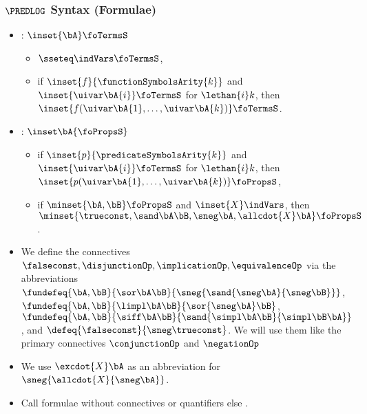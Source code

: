 \documentclass[notes,mh]{mikoslides}
\begin{document}
\begin{module}[id=pl1-syntax]
\begin{frame}[label=slide.pl1-syntax]
  \frametitle{$\PREDLOG$ Syntax (Formulae)}
  \begin{itemize}
  \item
    \begin{definition}[id=fo-terms.def,for={foterms,foTerms}]
      : $\inset{\bA}\foTermsS$ 
      \begin{itemize}
      \item $\sseteq\indVars\foTermsS$,
      \item if $\inset{f}{\functionSymbolsArity{k}}$ and $\inset{\uivar\bA{i}}\foTermsS$ for
        $\lethan{i}k$, then $\inset{f(\uivar\bA{1},\ldots,\uivar\bA{k})}\foTermsS$.
      \end{itemize}
    \end{definition}
  \item
    \begin{definition}[id=fo-propositions.def,for={foprops,foProps,allcdot}]
      : $\inset\bA{\foPropsS}$
      \begin{itemize}
      \item if $\inset{p}{\predicateSymbolsArity{k}}$ and $\inset{\uivar\bA{i}}\foTermsS$
        for $\lethan{i}k$, then $\inset{p(\uivar\bA{1},\ldots,\uivar\bA{k})}\foPropsS$,
      \item if $\minset{\bA,\bB}\foPropsS$ and $\inset{X}\indVars$, then
        $\minset{\trueconst,\sand\bA\bB,\sneg\bA,\allcdot{X}\bA}\foPropsS$.
      \end{itemize}
    \end{definition}
   \item 
     \begin{definition}[id=fo-connectives.def]
       We define the connectives
       $\falseconst,\disjunctionOp,\implicationOp,\equivalenceOp$ via the abbreviations
       $\fundefeq{\bA,\bB}{\sor\bA\bB}{\sneg{\sand{\sneg\bA}{\sneg\bB}}}$,
       $\fundefeq{\bA,\bB}{\limpl\bA\bB}{\sor{\sneg\bA}\bB}$,
       $\fundefeq{\bA,\bB}{\siff\bA\bB}{\sand{\simpl\bA\bB}{\simpl\bB\bA}}$, and
       $\defeq{\falseconst}{\sneg\trueconst}$.  We will use them like the primary
       connectives $\conjunctionOp$ and $\negationOp$
     \end{definition}
   \item
     \begin{definition}[id=fo-exquant.def,for=excdot]
       We use $\excdot{X}\bA$ as an abbreviation for
       $\sneg{\allcdot{X}{\sneg\bA}}$.
     \end{definition}
  \item
     \begin{definition}[id=fo-atoms.def]
       Call formulae without connectives or quantifiers {} else
       {}.
     \end{definition}
  \end{itemize}
\end{frame} 


\end{module}
\end{document}
